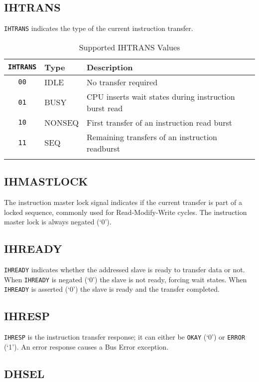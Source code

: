 \subsection{IHTRANS}\label{ihtrans}

\texttt{IHTRANS} indicates the type of the current instruction transfer.

\begin{longtable}[]{@{}cll@{}}
\toprule
{\tt IHTRANS} & Type & Description\tabularnewline
\midrule
\endhead
\texttt{00} & IDLE   & No transfer required\tabularnewline
\texttt{01} & BUSY   & CPU inserts wait states during instruction burst read\tabularnewline
\texttt{10} & NONSEQ & First transfer of an instruction read burst\tabularnewline
\texttt{11} & SEQ    & Remaining transfers of an instruction readburst\tabularnewline
\bottomrule
\caption{Supported IHTRANS Values}
\label{tab:ihtrans-values}
\end{longtable}

\subsection{IHMASTLOCK}\label{ihmastlock}

The instruction master lock signal indicates if the current transfer is
part of a locked sequence, commonly used for Read-Modify-Write cycles.
The instruction master lock is always negated (`0').

\subsection{IHREADY}\label{ihready}

\texttt{IHREADY} indicates whether the addressed slave is ready to transfer data
or not. When \texttt{IHREADY} is negated (`0') the slave is not ready, forcing
wait states. When \texttt{IHREADY} is asserted (`0') the slave is ready and the
transfer completed.

\subsection{IHRESP}\label{ihresp}

\texttt{IHRESP} is the instruction transfer response; it can either be \texttt{OKAY} (`0')
or \texttt{ERROR} (`1'). An error response causes a Bus Error exception.

\subsection{DHSEL}\label{dhsel}

